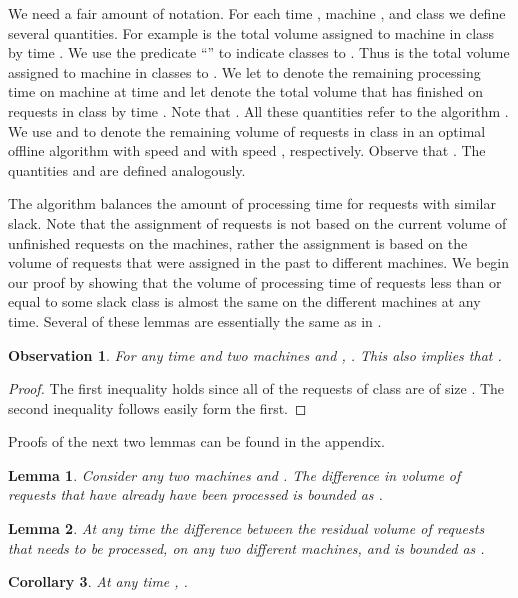 \documentclass[11pt]{article}
\newtheorem{lemma}{Lemma}[section]
\newtheorem{corollary}[lemma]{Corollary}
\newtheorem{observation}{Observation}
\newcommand{\lemlab}[1]{\label{lemma:#1}}
\newcommand{\corlab}[1]{\label{cor:#1}}
\begin{document}
We need a fair amount of notation. For each time , machine , and
class  we define several quantities. For example  is
the total volume assigned to machine  in class  by time . We
use the predicate ``'' to indicate classes  to .  Thus  is the total volume assigned to machine  in classes  to
. We let  to denote the remaining processing time on
machine  at time  and let  denote the total volume
that  has finished on requests in class  by time . Note that
. All these quantities refer
to the algorithm . We use  and  to
denote the remaining volume of requests in class  in an optimal
offline algorithm with speed  and  with speed ,
respectively. Observe that .  The
quantities  and  are defined
analogously.

The algorithm  balances the amount of processing time for
requests with similar slack.  Note that the assignment of requests
is not based on the current volume of unfinished requests on the
machines, rather the assignment is based on the volume of requests
that were assigned in the past to different machines.  We begin
our proof by showing that the volume of processing time of
requests less than or equal to some slack class is almost
the same on the different machines at any time. Several of these
lemmas are essentially the same as in \cite{AvrahamiA03}.

\begin{observation}
\label{observation} For any time  and two machines  and ,
.  This also implies that
.
\end{observation}
\begin{proof}
  The first inequality holds since all of the requests of class 
  are of size .  The second inequality follows easily
  form the first.
\end{proof}

Proofs of the next two lemmas can be found in the appendix.


\begin{lemma}
  \lemlab{processbound} Consider any two machines  and .  The
  difference in volume of requests that have already have been
  processed is bounded as .
\end{lemma}

\begin{lemma}
  \lemlab{closebound} At any time  the difference between the
  residual volume of requests that needs to be processed, on any two
  different machines,  and  is bounded as .
\end{lemma}


\begin{corollary}
  \corlab{optarrival} At any time , .
\end{corollary}
\end{document}
